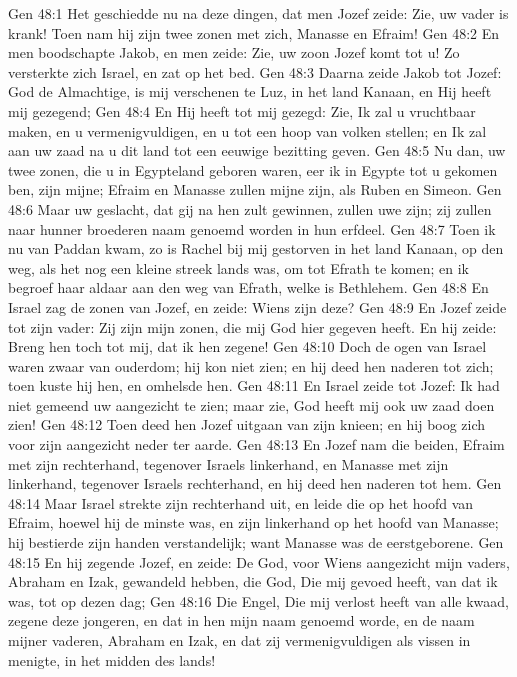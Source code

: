 Gen 48:1  Het geschiedde nu na deze dingen, dat men Jozef zeide: Zie, uw vader is krank! Toen nam hij zijn twee zonen met zich, Manasse en Efraim!
Gen 48:2  En men boodschapte Jakob, en men zeide: Zie, uw zoon Jozef komt tot u! Zo versterkte zich Israel, en zat op het bed.
Gen 48:3  Daarna zeide Jakob tot Jozef: God de Almachtige, is mij verschenen te Luz, in het land Kanaan, en Hij heeft mij gezegend;
Gen 48:4  En Hij heeft tot mij gezegd: Zie, Ik zal u vruchtbaar maken, en u vermenigvuldigen, en u tot een hoop van volken stellen; en Ik zal aan uw zaad na u dit land tot een eeuwige bezitting geven.
Gen 48:5  Nu dan, uw twee zonen, die u in Egypteland geboren waren, eer ik in Egypte tot u gekomen ben, zijn mijne; Efraim en Manasse zullen mijne zijn, als Ruben en Simeon.
Gen 48:6  Maar uw geslacht, dat gij na hen zult gewinnen, zullen uwe zijn; zij zullen naar hunner broederen naam genoemd worden in hun erfdeel.
Gen 48:7  Toen ik nu van Paddan kwam, zo is Rachel bij mij gestorven in het land Kanaan, op den weg, als het nog een kleine streek lands was, om tot Efrath te komen; en ik begroef haar aldaar aan den weg van Efrath, welke is Bethlehem.
Gen 48:8  En Israel zag de zonen van Jozef, en zeide: Wiens zijn deze?
Gen 48:9  En Jozef zeide tot zijn vader: Zij zijn mijn zonen, die mij God hier gegeven heeft. En hij zeide: Breng hen toch tot mij, dat ik hen zegene!
Gen 48:10  Doch de ogen van Israel waren zwaar van ouderdom; hij kon niet zien; en hij deed hen naderen tot zich; toen kuste hij hen, en omhelsde hen.
Gen 48:11  En Israel zeide tot Jozef: Ik had niet gemeend uw aangezicht te zien; maar zie, God heeft mij ook uw zaad doen zien!
Gen 48:12  Toen deed hen Jozef uitgaan van zijn knieen; en hij boog zich voor zijn aangezicht neder ter aarde.
Gen 48:13  En Jozef nam die beiden, Efraim met zijn rechterhand, tegenover Israels linkerhand, en Manasse met zijn linkerhand, tegenover Israels rechterhand, en hij deed hen naderen tot hem.
Gen 48:14  Maar Israel strekte zijn rechterhand uit, en leide die op het hoofd van Efraim, hoewel hij de minste was, en zijn linkerhand op het hoofd van Manasse; hij bestierde zijn handen verstandelijk; want Manasse was de eerstgeborene.
Gen 48:15  En hij zegende Jozef, en zeide: De God, voor Wiens aangezicht mijn vaders, Abraham en Izak, gewandeld hebben, die God, Die mij gevoed heeft, van dat ik was, tot op dezen dag;
Gen 48:16  Die Engel, Die mij verlost heeft van alle kwaad, zegene deze jongeren, en dat in hen mijn naam genoemd worde, en de naam mijner vaderen, Abraham en Izak, en dat zij vermenigvuldigen als vissen in menigte, in het midden des lands!

